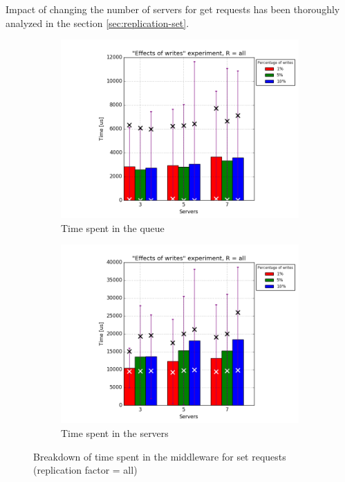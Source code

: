 \documentclass[11pt]{article}
\begin{document}
Impact of changing the number of servers for get requests has been thoroughly analyzed in the section \ref{sec:replication-set}.

\begin{figure}
\centering
\begin{subfigure}{.5\textwidth}
	\centering
	\includegraphics[width=\linewidth]{plots/writes-set-queue-2-replication}
	\caption{Time spent in the queue}
	\label{fig:writes-set-queue-2}
\end{subfigure}%
\begin{subfigure}{.5\textwidth}
	\centering
	\includegraphics[width=\linewidth]{plots/writes-set-servers-2-replication}
	\caption{Time spent in the servers}
	\label{fig:writes-set-servers-2}
\end{subfigure}
\caption{Breakdown of time spent in the middleware for set requests (replication factor = all)}
\label{fig:writes-set-breakdown-2}
\end{figure}
\end{document}
